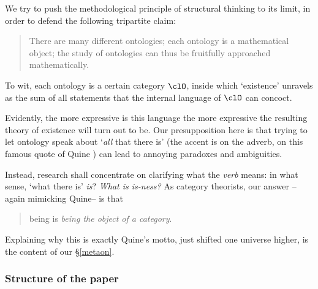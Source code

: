 We try to push the methodological principle of structural thinking to its limit, in order to defend the following tripartite claim: 
\begin{quote}
  There are many different ontologies; each ontology is a mathematical object; the study of ontologies can thus be fruitfully approached mathematically.
\end{quote}
To wit, each ontology is a certain category $\clO$, inside which `existence' unravels as the sum of all statements that the internal language of $\clO$ can concoct.

Evidently, the more expressive is this language the more expressive the resulting theory of existence will turn out to be. Our presupposition here is that trying to let ontology speak about `\emph{all} that there is' (the accent is on the adverb, on this famous quote of Quine \cite{quine1948there}) can lead to annoying paradoxes and ambiguities. 

Instead, research shall concentrate on clarifying what the \emph{verb} means: in what sense, `what there is' \emph{is}? \emph{What is is-ness?} As category theorists, our answer --again mimicking Quine-- is that
\begin{quote}
	being is \emph{being the object of a category}.
\end{quote}
Explaining why this is exactly Quine's motto, just shifted one universe higher, is the content of our §\ref{metaon}.
\subsubsection{Structure of the paper}

